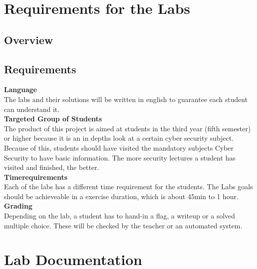 \section{Requirements for the Labs}

\subsection{Overview}

\subsection{Requirements}
\textbf{Language} \\
The labs and their solutions will be written in english to guarantee each student can understand it. \\[0.5cm]
\textbf{Targeted Group of Students} \\
The product of this project is aimed at students in the third year (fifth semester) or higher because it is an in depths look at a certain cyber security subject. Because of this, students should have visited the mandatory subjects Cyber Security to have basic information. The more security lectures a student has visited and finished, the better. \\[0.5cm]
\textbf{Timerequirements} \\
Each of the labs has a different time requirement for the students. The Labs goals should be achieveable in a exercise duration, which is about 45min to 1 hour. \\[0.5cm]
\textbf{Grading} \\
Depending on the lab, a student has to hand-in a flag, a writeup or a solved multiple choice. These will be checked by the teacher or an automated system. \\[0.5cm]

\section{Lab Documentation}
